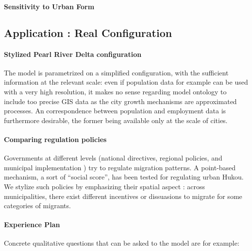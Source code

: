 \paragraph{Sensitivity to Urban Form}





\subsection{Application : Real Configuration}



\paragraph{Stylized Pearl River Delta configuration}

The model is parametrized on a simplified configuration, with the sufficient information at the relevant scale: even if population data for example can be used with a very high resolution, it makes no sense regarding model ontology to include too precise GIS data as the city growth mechanisms are approximated processes. An correspondence between population and employment data is furthermore desirable, the former being available only at the scale of cities.


\paragraph{Comparing regulation policies}

Governments at different levels (national directives, regional policies, and municipal implementation ) try to regulate migration patterns. A point-based mechanism, a sort of ``social score'', has been tested for regulating urban Hukou. We stylize such policies by emphasizing their spatial aspect : across municipalities, there exist different incentives or dissuasions to migrate for some categories of migrants.


\paragraph{Experience Plan}

Concrete qualitative questions that can be asked to the model are for example:

